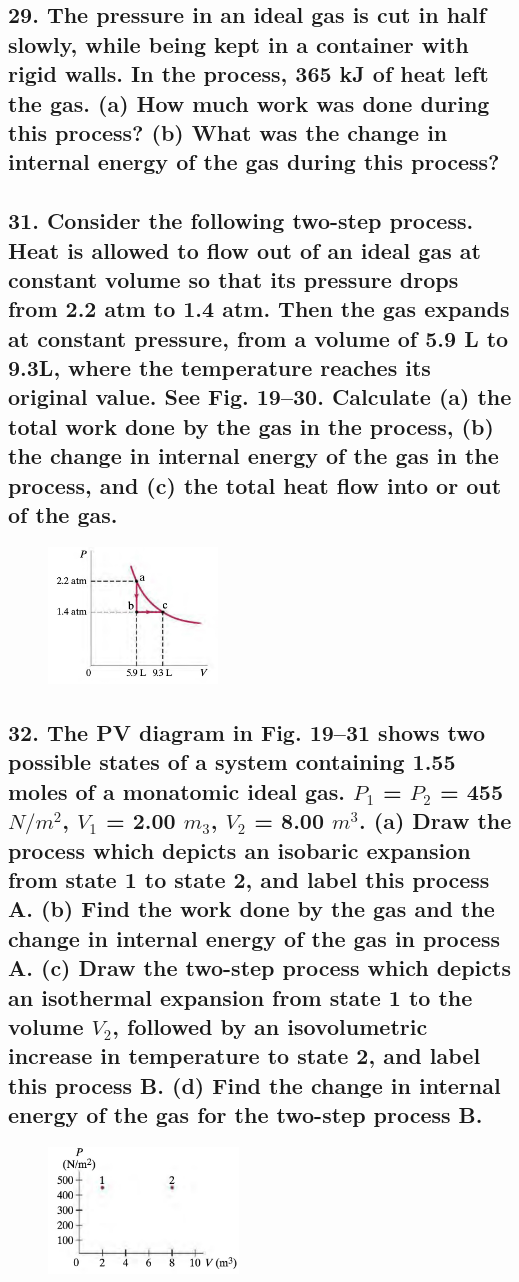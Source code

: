 \documentclass{article}
\begin{document}
    \subsection*{29. The pressure in an ideal gas is cut in half slowly, while being kept in a container with rigid walls. In the process, 365 kJ of heat left the gas. (a) How much work was done during this process? (b) What was the change in internal energy of the gas during this process?}
    \vspace{3in}
    \subsection*{31. Consider the following two-step process. Heat is allowed to flow out of an ideal gas at constant volume so that its pressure drops from 2.2 atm to 1.4 atm. Then the gas expands at constant pressure, from a volume of 5.9 L to 9.3L, where the temperature reaches its original value. See Fig. 19–30. Calculate (a) the total work done by the gas in the process,
(b) the change in internal energy of the gas in the process, and (c) the total heat flow into or out of the gas.}
    \begin{figure}[h]
            \includegraphics[width=0.4\textwidth]{figures/fig19-30.jpg}
    \end{figure}
    \newpage
    \subsection*{32. The PV diagram in Fig. 19–31 shows two possible states of a system containing 1.55 moles of a monatomic ideal gas. $P_1$ = $P_2$ = 455 $N/m^2$, $V_1$ = 2.00 $m_3$, $V_2$ = 8.00 $m^3$. (a) Draw the process which depicts an isobaric expansion from state 1 to state 2, and label this process A. (b) Find the work done by the gas and the change in internal energy of the gas in process A. (c) Draw the two-step process which depicts an isothermal expansion from state 1 to the volume $V_2$, followed by an isovolumetric increase in temperature to
    state 2, and label this process B. (d) Find the change in internal energy of the gas for the two-step process B.}
    \begin{figure}[h]
        \includegraphics[width=0.45\textwidth]{figures/fig19-31.jpg}
    \end{figure}
    \newpage
\end{document}
